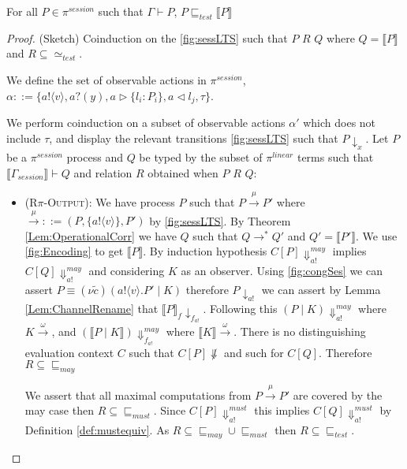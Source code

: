 For all $P \in \pi^{session}$ such that $\Gamma \vdash P$, $P \sqsubseteq_{test} \llbracket P \rrbracket$

\begin{proof}
(Sketch) Coinduction on the \autoref{fig:sessLTS} such that $P$ $R$ $Q$ where $Q = \llbracket P \rrbracket$ and $R \subseteq \simeq_{test}$.

We define the set of observable actions in $\pi^{session}$, $\alpha ::= \{a!\langle v \rangle, a?(y), a \vartriangleright \{l_i : P_i \}, a \vartriangleleft l_j, \tau \}$.

We perform coinduction on a subset of observable actions $\alpha'$ which does not include $\tau$, and display the relevant transitions \autoref{fig:sessLTS} such that $P \downarrow_{x}$. Let $P$ be a $\pi^{session}$ process and $Q$ be typed by the subset of $\pi^{linear}$ terms such that $\llbracket \Gamma_{session} \rrbracket \vdash Q$ and relation $R$ obtained when $P$ $R$ $Q$:

\begin{itemize}
    \item \textsc{(R$\pi$-Output)}: We have process $P$ such that $P \xrightarrow{\mu} P'$ where $\xrightarrow{\mu} ::= (P, \{a!\langle v \rangle \}, P')$ by \autoref{fig:sessLTS}. By Theorem \ref{Lem:OperationalCorr} we have $Q$ such that $Q \rightarrow^* Q'$ and $Q' = \llbracket P' \rrbracket$. We use \autoref{fig:Encoding} to get $\llbracket P \rrbracket$. By induction hypothesis $C[P] \Downarrow^{may}_{a!}$ implies $C[Q] \Downarrow^{may}_{a!}$ and considering $K$ as an observer. Using \autoref{fig:congSes} we can assert $P \equiv (\nu \widetilde{c})(a!\langle v \rangle.P' \mid K)$ therefore $P \downarrow_{a!}$ we can assert by Lemma \ref{Lem:ChannelRename} that $\llbracket P \rrbracket_f \downarrow_{f_{a!}}$. Following this $(P \mid K) \Downarrow^{may}_{a!}$ where $K \xrightarrow{\omega}$, and $(\llbracket P \mid K \rrbracket) \Downarrow^{may}_{f_{a!}}$ where $\llbracket K \rrbracket \xrightarrow{\omega}$. There is no distinguishing evaluation context $C$ such that $C[P] \not \Downarrow$ and such for $C[Q]$. Therefore $R \subseteq \sqsubseteq_{may}$
    
    We assert that all maximal computations from $P \xrightarrow{\mu} P'$ are covered by the may case then $R \subseteq \sqsubseteq_{must}$. Since $C[P] \Downarrow^{must}_{a!}$ this implies $C[Q] \Downarrow^{must}_{a!}$ by Definition \ref{def:mustequiv}. As $R \subseteq \sqsubseteq_{may} \cup \sqsubseteq_{must}$ then $R \subseteq \sqsubseteq_{test}$.
    

\end{itemize}
\end{proof}
